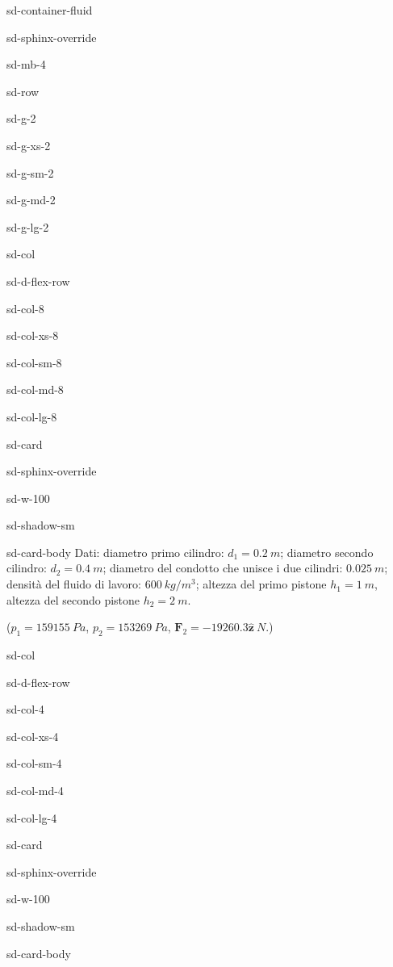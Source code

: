 \documentclass[letterpaper,10pt,italian]{jupyterBook}
\begin{document}
\begin{sphinxuseclass}{sd-container-fluid}
\begin{sphinxuseclass}{sd-sphinx-override}
\begin{sphinxuseclass}{sd-mb-4}
\begin{sphinxuseclass}{sd-row}
\begin{sphinxuseclass}{sd-g-2}
\begin{sphinxuseclass}{sd-g-xs-2}
\begin{sphinxuseclass}{sd-g-sm-2}
\begin{sphinxuseclass}{sd-g-md-2}
\begin{sphinxuseclass}{sd-g-lg-2}
\begin{sphinxuseclass}{sd-col}
\begin{sphinxuseclass}{sd-d-flex-row}
\begin{sphinxuseclass}{sd-col-8}
\begin{sphinxuseclass}{sd-col-xs-8}
\begin{sphinxuseclass}{sd-col-sm-8}
\begin{sphinxuseclass}{sd-col-md-8}
\begin{sphinxuseclass}{sd-col-lg-8}
\begin{sphinxuseclass}{sd-card}
\begin{sphinxuseclass}{sd-sphinx-override}
\begin{sphinxuseclass}{sd-w-100}
\begin{sphinxuseclass}{sd-shadow-sm}
\begin{sphinxuseclass}{sd-card-body}
\sphinxAtStartPar
Dati: diametro primo cilindro: \(d_1 = 0.2\ m\); diametro secondo cilindro:
\(d_2 = 0.4\ m\); diametro del condotto che unisce i due cilindri:
\(0.025\ m\);
densità del fluido di lavoro: \(600\ kg/m^3\);
altezza del primo pistone \(h_1 = 1\ m\), altezza del secondo pistone
\(h_2=2\ m\).

\sphinxAtStartPar
(\(p_1=159155\ Pa\), \(p_2=153269\ Pa\), \(\mathbf{F}_2=-19260.3 \hat{\mathbf{z}}\ N\).)

\end{sphinxuseclass}
\end{sphinxuseclass}
\end{sphinxuseclass}
\end{sphinxuseclass}
\end{sphinxuseclass}
\end{sphinxuseclass}
\end{sphinxuseclass}
\end{sphinxuseclass}
\end{sphinxuseclass}
\end{sphinxuseclass}
\end{sphinxuseclass}
\end{sphinxuseclass}
\begin{sphinxuseclass}{sd-col}
\begin{sphinxuseclass}{sd-d-flex-row}
\begin{sphinxuseclass}{sd-col-4}
\begin{sphinxuseclass}{sd-col-xs-4}
\begin{sphinxuseclass}{sd-col-sm-4}
\begin{sphinxuseclass}{sd-col-md-4}
\begin{sphinxuseclass}{sd-col-lg-4}
\begin{sphinxuseclass}{sd-card}
\begin{sphinxuseclass}{sd-sphinx-override}
\begin{sphinxuseclass}{sd-w-100}
\begin{sphinxuseclass}{sd-shadow-sm}
\begin{sphinxuseclass}{sd-card-body}
\sphinxAtStartPar

\end{sphinxuseclass}
\end{sphinxuseclass}
\end{sphinxuseclass}
\end{sphinxuseclass}
\end{sphinxuseclass}
\end{sphinxuseclass}
\end{sphinxuseclass}
\end{sphinxuseclass}
\end{sphinxuseclass}
\end{sphinxuseclass}
\end{sphinxuseclass}
\end{sphinxuseclass}
\end{sphinxuseclass}
\end{sphinxuseclass}
\end{sphinxuseclass}
\end{sphinxuseclass}
\end{sphinxuseclass}
\end{sphinxuseclass}
\end{sphinxuseclass}
\end{sphinxuseclass}
\end{sphinxuseclass}
\end{document}
